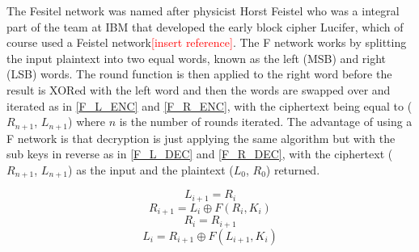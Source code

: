 \documentclass[12pt,twoside,a4paper]{report}
\begin{document}
    The Fesitel network was named after physicist Horst Feistel who was a integral part of the team at IBM that developed the early block cipher Lucifer, which of course used a Feistel network\textcolor{red}{[insert reference]}. The F network works by splitting the input plaintext into two equal words, known as the left (MSB) and right (LSB) words. The round function is then applied to the right word before the result is XORed with the left word and then the words are swapped over and iterated as in \autoref{F_L_ENC} and \ref{F_R_ENC}, with the ciphertext being equal to ($R_{n+1}$, $L_{n+1}$) where $n$ is the number of rounds iterated. The advantage of using a F network is that decryption is just applying the same algorithm but with the sub keys in reverse as in \autoref{F_L_DEC} and \ref{F_R_DEC}, with the ciphertext ($R_{n+1}$, $L_{n+1}$) as the input and the plaintext ($L_0$, $R_0$) returned.
    

    \begin{equation}
    \label{F_L_ENC}
    L_{i+1} = R_i
    \end{equation}
    \begin{equation}
    \label{F_R_ENC}
    R_{i+1} = L_i \oplus F(R_i, K_i)
    \end{equation}
    \begin{equation}
    \label{F_L_DEC}
    R_i = R_{i+1}
    \end{equation}
    \begin{equation}
    \label{F_R_DEC}
    L_i = R_{i+1} \oplus F(L_{i+1}, K_i)
    \end{equation}
    
\end{document}
